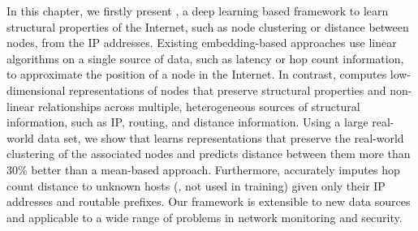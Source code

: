 In this chapter, we firstly present \system{}, a deep learning based framework to learn structural properties of the Internet, such as node clustering or distance between nodes, from the IP addresses. 
%
Existing embedding-based approaches use linear algorithms on a single source of data, such as latency or hop count information, to approximate the position of a node in the Internet.
%
In contrast, \system{} computes low-dimensional representations of nodes that preserve structural properties and non-linear relationships across multiple, heterogeneous sources of structural information, such as IP, routing, and distance information.
%
%
Using a large real-world data set, we show that \system{} learns representations that preserve the real-world clustering of the associated nodes and predicts distance between them more than 30\% better than a mean-based approach. 
%
Furthermore, \system{} accurately imputes hop count distance to  unknown hosts (\ie{}, not used in training) given only their IP addresses and routable prefixes.
Our framework is extensible to new data sources and applicable to a wide range of problems in network monitoring and security.


